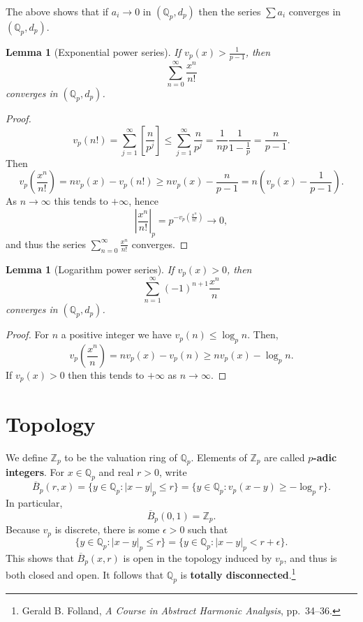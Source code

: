 \documentclass{article}
\newtheorem{lemma}[theorem]{Lemma}
\theoremstyle{definition}
\begin{document}
The above shows that if $a_i \to 0$ in $(\mathbb{Q}_p,d_p)$ then the series $\sum a_i$ converges in
$(\mathbb{Q}_p,d_p)$. 

\begin{lemma}[Exponential power series]
If $v_p(x)>\frac{1}{p-1}$, then
\[
\sum_{n=0}^\infty \frac{x^n}{n!}
\]
converges in $(\mathbb{Q}_p,d_p)$. 
\end{lemma}
\begin{proof}
\[
v_p(n!) = \sum_{j=1}^\infty \left[ \frac{n}{p^j} \right]
\leq \sum_{j=1}^\infty \frac{n}{p^j}
=\frac{1}{np} \frac{1}{1-\frac{1}{p}}
=\frac{n}{p-1}.
\]
Then
\[
v_p\left( \frac{x^n}{n!} \right) = n v_p(x) - v_p(n!) 
\geq n v_p(x) - \frac{n}{p-1}
=n\left(v_p(x)-\frac{1}{p-1}\right).
\]
As $n \to \infty$ this tends to $+\infty$, hence
\[
\left| \frac{x^n}{n!} \right|_p = p^{-v_p\left( \frac{x^n}{n!} \right)} \to 0,
\]
and thus the series $\sum_{n=0}^\infty \frac{x^n}{n!}$ converges. 
\end{proof}


\begin{lemma}[Logarithm power series]
If $v_p(x)>0$, then
\[
\sum_{n=1}^\infty (-1)^{n+1} \frac{x^n}{n}
\]
converges in $(\mathbb{Q}_p,d_p)$. 
\end{lemma}
\begin{proof}
For $n$ a positive integer we have $v_p(n) \leq \log_p n$. Then,
\[
v_p\left(\frac{x^n}{n}\right)=
nv_p(x)-v_p(n) \geq 
nv_p(x)-\log_p n.
\]
If $v_p(x)>0$ then this tends to $+\infty$ as $n \to \infty$.
\end{proof}



\section{Topology}
We define $\mathbb{Z}_p$ to be the valuation ring of $\mathbb{Q}_p$. Elements of $\mathbb{Z}_p$ are called
\textbf{$p$-adic integers}. 
For $x \in \mathbb{Q}_p$ and real $r>0$, write
\[
\overline{B}_p(r,x) = \{y \in \mathbb{Q}_p:|x-y|_p \leq r\}
=\{y \in \mathbb{Q}_p: v_p(x-y) \geq -\log_p r\}.
\]
In particular,
\[
\overline{B}_p(0,1) = \mathbb{Z}_p.
\]
Because $v_p$ is discrete, there is some $\epsilon>0$ such that
\[
\{y \in \mathbb{Q}_p: |x-y|_p \leq r\} = 
\{y \in \mathbb{Q}_p: |x-y|_p < r+\epsilon\}.
\]
This shows that $\overline{B}_p(x,r)$ is open in the topology induced by $v_p$, and thus is both closed and open. 
It follows that $\mathbb{Q}_p$ is \textbf{totally disconnected}.\footnote{Gerald B. Folland, {\em A Course in Abstract Harmonic Analysis}, pp.~34--36.}
\end{document}
